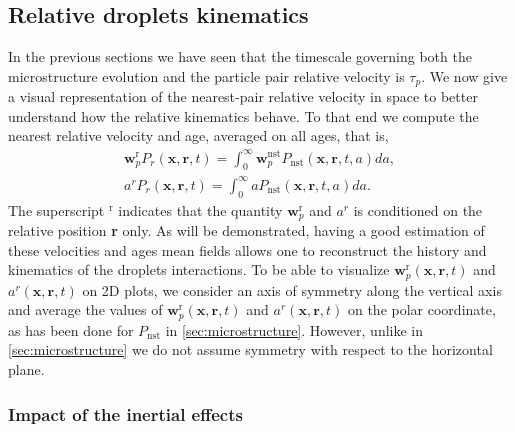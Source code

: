 \subsection{Relative droplets kinematics  }

In the previous sections we have seen that the timescale governing both the microstructure evolution and the particle pair relative velocity is $\tau_p$.   
We now give a visual representation of the nearest-pair relative velocity in space to better understand how the relative kinematics   behave.  
To that end we compute the nearest relative velocity and age, averaged on all ages, that is,
\begin{align*}
    \textbf{w}^\text{r}_pP_r(\textbf{x},\textbf{r},t)
    =\int_0^\infty \textbf{w}^\text{nst}_pP_\text{nst}(\textbf{x},\textbf{r},t,a) da,\\
    a^rP_r(\textbf{x},\textbf{r},t)
    =\int_0^\infty a P_\text{nst}(\textbf{x},\textbf{r},t,a) da.
\end{align*}
The superscript $^\text{r}$ indicates that the quantity $\textbf{w}^\text{r}_p$ and $a^r$ is conditioned on the relative position \textbf{r} only.
As will be demonstrated, having a good estimation of these velocities and ages mean fields allows one to reconstruct the history and kinematics   of the droplets interactions. 
To be able to visualize
$\textbf{w}^\text{r}_p(\textbf{x},\textbf{r},t)$
and 
$a^r(\textbf{x},\textbf{r},t)$
on 2D plots, we consider an axis of symmetry along the vertical axis and average the values of 
$\textbf{w}^\text{r}_p(\textbf{x},\textbf{r},t)$
and $a^r(\textbf{x},\textbf{r},t)$
on the polar coordinate, as has been done for $P_\text{nst}$ in \ref{sec:microstructure}. 
However, unlike in \ref{sec:microstructure} we do not assume symmetry with respect to the horizontal plane. 

\subsubsection{Impact of the inertial effects}

